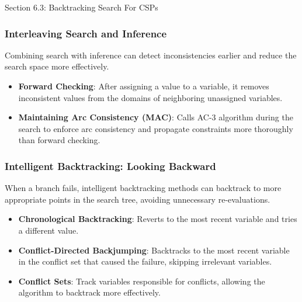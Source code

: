 \begin{notes}{Section 6.3: Backtracking Search For CSPs}
    \subsubsection*{Interleaving Search and Inference}
    
    Combining search with inference can detect inconsistencies earlier and reduce the search space more effectively.
    
    \begin{highlight}
    
        \begin{itemize}
            \item \textbf{Forward Checking}: After assigning a value to a variable, it removes inconsistent values from the domains of neighboring unassigned variables.
            \item \textbf{Maintaining Arc Consistency (MAC)}: Calls AC-3 algorithm during the search to enforce arc consistency and propagate constraints more thoroughly than forward checking.
        \end{itemize}
    
    \end{highlight}
    
    \subsubsection*{Intelligent Backtracking: Looking Backward}
    
    When a branch fails, intelligent backtracking methods can backtrack to more appropriate points in the search tree, avoiding unnecessary re-evaluations.
    
    \begin{highlight}
    
        \begin{itemize}
            \item \textbf{Chronological Backtracking}: Reverts to the most recent variable and tries a different value.
            \item \textbf{Conflict-Directed Backjumping}: Backtracks to the most recent variable in the conflict set that caused the failure, skipping irrelevant variables.
            \item \textbf{Conflict Sets}: Track variables responsible for conflicts, allowing the algorithm to backtrack more effectively.
        \end{itemize}
    

\end{highlight}
\end{notes}
